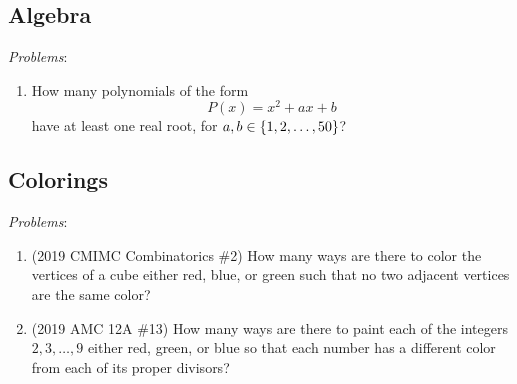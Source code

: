 \subsection{Algebra}

\textit{Problems}: 
\begin{enumerate}
    \item How many polynomials of the form
        \[
            P \left( x \right) = x^2 + ax + b
        \]
        have at least one real root, for \( a, b \in \left\{ 1, 2, \ldots, 50 \right\} \)?
\end{enumerate}

\subsection{Colorings}

\textit{Problems}: 
\begin{enumerate}
    \item (2019 CMIMC Combinatorics \#2) How many ways are there to color the
        vertices of a cube either red, blue, or green such that no two adjacent
        vertices are the same color?

    \item (2019 AMC 12A \#13) How many ways are there to paint each of the
        integers \( 2,3,\ldots,9 \) either red, green, or blue so that each
        number has a different color from each of its proper divisors?
\end{enumerate}
